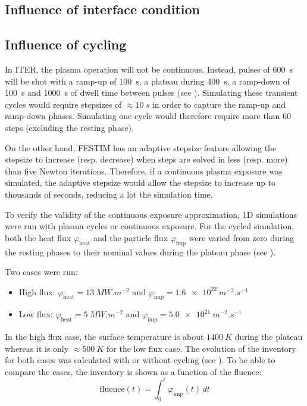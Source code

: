 \subsection{Influence of interface condition}


\subsection{Influence of cycling}

In ITER, the plasma operation will not be continuous.
Instead, pulses of \SI{600}{s} will be shot  with a ramp-up of \SI{100}{s}, a plateau during \SI{400}{s}, a ramp-down of \SI{100}{s} and \SI{1000}{s} of dwell time between pulses (see ).
Simulating these transient cycles would require stepsizes of $\approx \SI{10}{s}$ in order to capture the ramp-up and ramp-down phases.
Simulating one cycle would therefore require more than 60 steps (excluding the resting phase).

On the other hand, FESTIM has an adaptive stepsize feature allowing the stepsize to increase (resp. decrease) when steps are solved in less (resp. more) than five Newton iterations.
Therefore, if a continuous plasma exposure was simulated, the adaptive stepsize would allow the stepsize to increase up to thousands of seconds, reducing a lot the simulation time.

To verify the validity of the continuous exposure approximation, 1D simulations were run with plasma cycles or continuous exposure.
For the cycled simulation, both the heat flux $\varphi_\mathrm{heat}$ and the particle flux $\varphi_\mathrm{imp}$ were varied from zero during the resting phases to their nominal values during the plateau phase (see ).

Two cases were run:
\begin{itemize}
    \item High flux: $\varphi_\mathrm{heat} = \SI{13}{MW.m^{-2}}$ and $\varphi_\mathrm{imp} = \SI{1.6e22}{m^{-2}.s^{-1}}$
    \item Low flux: $\varphi_\mathrm{heat} = \SI{5}{MW.m^{-2}}$ and $\varphi_\mathrm{imp} = \SI{5.0e21}{m^{-2}.s^{-1}}$
\end{itemize}

In the high flux case, the surface temperature is about $\SI{1400}{K}$ during the plateau whereas it is only $\approx \SI{500}{K}$ for the low flux case.
The evolution of the inventory for both cases was calculated with or without cycling (see ).
To be able to compare the cases, the inventory is shown as a function of the fluence:
\begin{equation}
    \mathrm{fluence}(t) = \int_0^t \varphi_\mathrm{imp}(t) \, dt
\end{equation}


